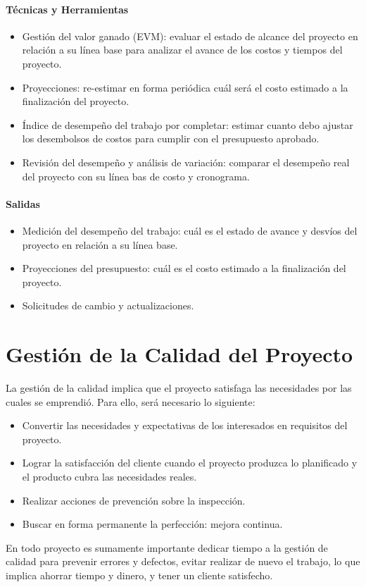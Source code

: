 \documentclass[a4paper,twosides]{article}
\newlength{\wideitemsep}
\let\olditem\item
\renewcommand{\item}{\setlength{\itemsep}{\wideitemsep}\olditem}
\begin{document}
\paragraph{Técnicas y Herramientas}
\begin{itemize}
\item Gestión del valor ganado (EVM): evaluar el estado de alcance del proyecto en relación a su línea base para analizar el avance de los costos y tiempos del proyecto.
\item Proyecciones: re-estimar en forma periódica cuál será el costo estimado a la finalización del proyecto.
\item Índice de desempeño del trabajo por completar: estimar cuanto debo ajustar los desembolsos de costos para cumplir con el presupuesto aprobado.
\item Revisión del desempeño y análisis de variación: comparar el desempeño real del proyecto con su línea bas de costo y cronograma.
\end{itemize}

\paragraph{Salidas}
\begin{itemize}
\item Medición del desempeño del trabajo: cuál es el estado de avance y desvíos del proyecto en relación a su línea base.
\item Proyecciones del presupuesto: cuál es el costo estimado a la finalización del proyecto.
\item Solicitudes de cambio y actualizaciones.
\end{itemize}


\section{Gestión de la Calidad del Proyecto}
La gestión de la calidad implica que el proyecto satisfaga las necesidades por las cuales se emprendió. Para ello, será necesario lo siguiente:
\begin{itemize}
\item Convertir las necesidades y expectativas de los interesados en requisitos del proyecto.
\item Lograr la satisfacción del cliente cuando el proyecto produzca lo planificado y el producto cubra las necesidades reales.
\item Realizar acciones de prevención sobre la inspección.
\item Buscar en forma permanente la perfección: mejora continua.
\end{itemize}
\par En todo proyecto es sumamente importante dedicar tiempo a la gestión de calidad para prevenir errores y defectos, evitar realizar de nuevo el trabajo, lo que implica ahorrar tiempo y dinero, y tener un cliente satisfecho.
\end{document}
